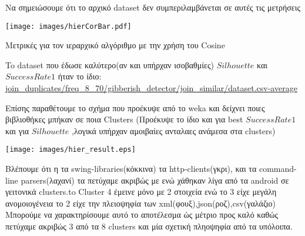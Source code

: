 Να σημειώσουμε ότι το αρχικό dataset δεν συμπεριλαμβάνεται σε αυτές τις μετρήσεις

\noindent\begin{minipage}{\linewidth}
    \texttt{[image: images/hierCorBar.pdf]}
    \caption{Μετρικές για τον ιεραρχικό αλγόριθμο με την χρήση του Cosine}
    \label{fig:CorrelationHier}
\end{minipage}

To dataset που έδωσε καλύτερο(αν και υπήρχαν ισοβαθμίες) $Silhouette$ και $Success Rate 1$ ήταν το ίδιο: \\ \url{join_duplicates/freq_8_70/gibberish_detector/join_similar/dataset.csv-average}\\

\begin{minipage}{\linewidth}
    \centering
    \label{my-label}
\end{minipage}

Επίσης παραθέτουμε το σχήμα που προέκυψε από το weka και δείχνει ποιες
βιβλιοθήκες μπήκαν σε ποια Clusters (Προέκυψε το ίδιο και για best $Success Rate 1$ και για $Silhouette$ ,λογικά υπήρχαν αμοιβαίες ανταλαες ανάμεσα στα clusters)

\noindent\begin{minipage}{\linewidth}
    \texttt{[image: images/hier\_result.eps]}
    \label{fig:clustering}
\end{minipage}

Βλέπουμε ότι η τα swing-libraries(κόκκινα) τα http-clients(γκρι), 
και τα command-line parsers(λαχανί) τα πετύχαμε ακριβώς με ενώ χάθηκαν 
λίγα από τα android σε γειτονικά clusters.to Cluster 4 έμεινε μόνο με 2 στοιχεία ενώ το 3 είχε μεγάλη ανομοιογένεια το 2 είχε την πλειοψηφία των xml(φουξ),json(ροζ),csv(γαλάζιο)
Μπορούμε να χαρακτηρίσουμε αυτό το αποτέλεσμα ώς μέτριο προς καλό
καθώς πετύχαμε ακριβώς 3 από τα 8 clusters και μία σχετική πληοψηφία από τα υπόλοιπα.



